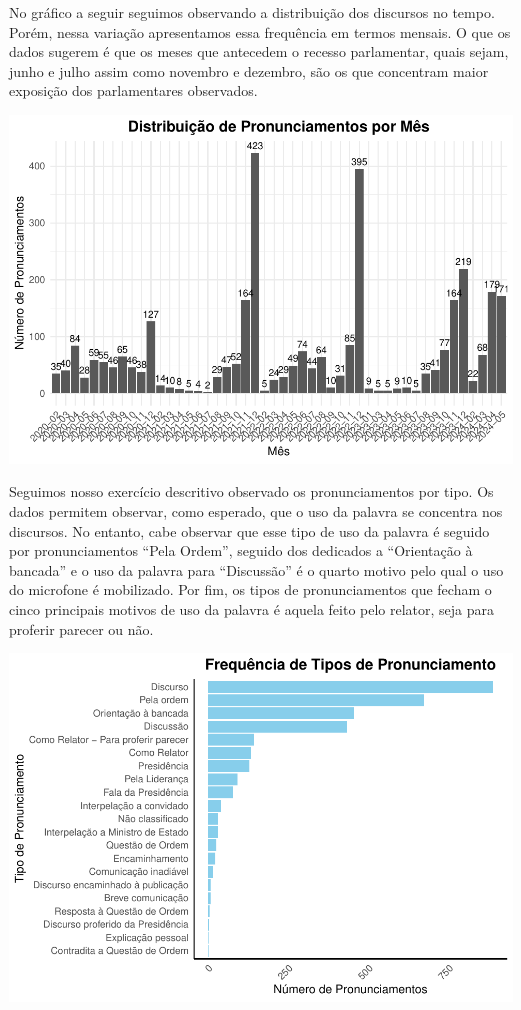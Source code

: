 \documentclass{article}
\begin{document}
No gráfico a seguir seguimos observando a distribuição dos discursos no
tempo. Porém, nessa variação apresentamos essa frequência em termos
mensais. O que os dados sugerem é que os meses que antecedem o recesso
parlamentar, quais sejam, junho e julho assim como novembro e dezembro,
são os que concentram maior exposição dos parlamentares observados.

\includegraphics{Texto_files/figure-latex/unnamed-chunk-12-1.pdf}

Seguimos nosso exercício descritivo observado os pronunciamentos por
tipo. Os dados permitem observar, como esperado, que o uso da palavra se
concentra nos discursos. No entanto, cabe observar que esse tipo de uso
da palavra é seguido por pronunciamentos ``Pela Ordem'', seguido dos
dedicados a ``Orientação à bancada'' e o uso da palavra para
``Discussão'' é o quarto motivo pelo qual o uso do microfone é
mobilizado. Por fim, os tipos de pronunciamentos que fecham o cinco
principais motivos de uso da palavra é aquela feito pelo relator, seja
para proferir parecer ou não.

\includegraphics{Texto_files/figure-latex/unnamed-chunk-13-1.pdf}
\end{document}
